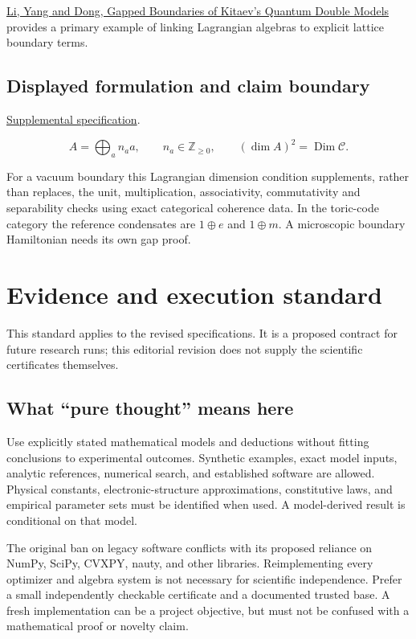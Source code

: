 \documentclass[
  11pt,
]{article}
\begin{document}
\href{https://arxiv.org/abs/2504.19512}{Li, Yang and Dong, Gapped
Boundaries of Kitaev's Quantum Double Models} provides a primary example
of linking Lagrangian algebras to explicit lattice boundary terms.

\subsection{Displayed formulation and claim boundary}

\href{https://github.com/rick-stevens-ai/Pure-Thought/blob/main/supplemental/S08.md}{Supplemental
specification}.

\[A=\bigoplus_a n_a a,\qquad n_a\in\mathbb Z_{\ge0},\qquad
(\dim A)^2=\operatorname{Dim}\mathcal C.\]

For a vacuum boundary this Lagrangian dimension condition supplements,
rather than replaces, the unit, multiplication, associativity,
commutativity and separability checks using exact categorical coherence
data. In the toric-code category the reference condensates are
\(1\oplus e\) and \(1\oplus m\). A microscopic boundary Hamiltonian
needs its own gap proof.

\section{Evidence and execution standard}

This standard applies to the revised specifications. It is a proposed
contract for future research runs; this editorial revision does not
supply the scientific certificates themselves.

\subsection{What ``pure thought'' means here}

Use explicitly stated mathematical models and deductions without fitting
conclusions to experimental outcomes. Synthetic examples, exact model
inputs, analytic references, numerical search, and established software
are allowed. Physical constants, electronic-structure approximations,
constitutive laws, and empirical parameter sets must be identified when
used. A model-derived result is conditional on that model.

The original ban on legacy software conflicts with its proposed reliance
on NumPy, SciPy, CVXPY, nauty, and other libraries. Reimplementing every
optimizer and algebra system is not necessary for scientific
independence. Prefer a small independently checkable certificate and a
documented trusted base. A fresh implementation can be a project
objective, but must not be confused with a mathematical proof or novelty
claim.
\end{document}
